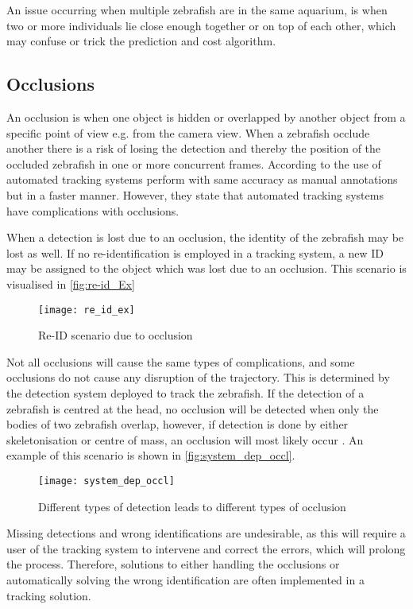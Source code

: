 An issue occurring when multiple zebrafish are in the same aquarium, is when two or more individuals lie close enough together or on top of each other, which may confuse or trick the prediction and cost algorithm.

\subsection{Occlusions}
An occlusion is when one object is hidden or overlapped by another object from a specific point of view e.g. from the camera view. When a zebrafish occlude another there is a risk of losing the detection and thereby the position of the occluded zebrafish in one or more concurrent frames. According to  \cite{Green2012} the use of automated tracking systems perform with same accuracy as manual annotations but in a faster manner. However, they state that automated tracking systems have complications with occlusions. 

When a detection is lost due to an occlusion, the identity of the zebrafish may be lost as well. If no re-identification is employed in a tracking system, a new ID may be assigned to the object which was lost due to an occlusion. This scenario is visualised in \autoref{fig:re-id_Ex}

\begin{figure}[H]
	\centering
	\texttt{[image: re\_id\_ex]}
	\caption{Re-ID scenario due to occlusion}
	\label{fig:re-id_Ex}
\end{figure}

Not all occlusions will cause the same types of complications, and some occlusions do not cause any disruption of the trajectory. This is determined by the detection system deployed to track the zebrafish. If the detection of a zebrafish is centred at the head, no occlusion will be detected when only the bodies of two zebrafish overlap, however, if detection is done by either skeletonisation or centre of mass, an occlusion will most likely occur \citep{Feijo2018}. An example of this scenario is shown in \autoref{fig:system_dep_occl}.

\begin{figure}[H]
	\centering
	\texttt{[image: system\_dep\_occl]}
	\caption{Different types of detection leads to different types of occlusion}
	\label{fig:system_dep_occl}
\end{figure}

Missing detections and wrong identifications are undesirable, as this will require a user of the tracking system to intervene and correct the errors, which will prolong the process. Therefore, solutions to either handling the occlusions or automatically solving the wrong identification are often implemented in a tracking solution.

